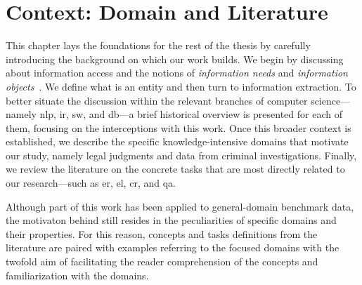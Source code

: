 \chapter{Context: Domain and Literature}




This chapter lays the foundations for the rest of the thesis by carefully introducing the background on which our work builds. We begin by discussing about information access and the notions of \emph{information needs} and \emph{information objects}~\cite{entityorientedsearch2018balog}. We define what is an entity and then turn to information extraction. To better situate the discussion within the relevant branches of computer science---namely \acl{nlp}, \acl{ir}, \acl{sw}, and \acl{db}---a brief historical overview is presented for each of them, focusing on the interceptions with this work. Once this broader context is established, we describe the specific knowledge-intensive domains that motivate our study, namely legal judgments and data from criminal investigations. Finally, we review the literature on the concrete tasks that are most directly related to our research---such as \acl{er}, \acl{el}, \acl{cr}, and \acl{qa}.

Although part of this \phd work has been applied to general-domain benchmark data, the motivaton behind still resides in the peculiarities of specific domains and their properties.
For this reason, concepts and tasks definitions from the literature are paired with examples referring to the focused domains with the twofold aim of facilitating the reader comprehension of the concepts and familiarization with the domains.  




